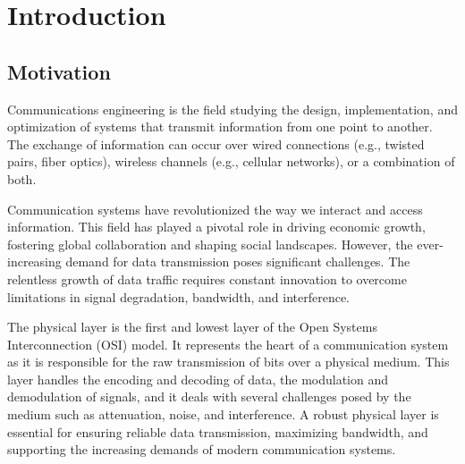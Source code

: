 \chapter{Introduction}
\label{sec:intro}




\section{Motivation}
Communications engineering is the field studying the design, implementation, and optimization of systems that transmit information from one point to another. 
The exchange of information can occur over wired connections (e.g., twisted pairs, fiber optics), wireless channels (e.g., cellular networks), or a combination of both. 

Communication systems have revolutionized the way we interact and access information. This field has played a pivotal role in driving economic growth, fostering global collaboration and shaping social landscapes. However, the ever-increasing demand for data transmission poses significant challenges. The relentless growth of data traffic requires constant innovation to overcome limitations in signal degradation, bandwidth, and interference.

The physical layer is the first and lowest layer of the Open Systems Interconnection (OSI) model. It represents the heart of a communication system as it is responsible for the raw transmission of bits over a physical medium. This layer handles the encoding and decoding of data, the modulation and demodulation of signals, and it deals with several challenges posed by the medium such as attenuation, noise, and interference.  
A robust physical layer is essential for ensuring reliable data transmission, maximizing bandwidth, and supporting the increasing demands of modern communication systems.

